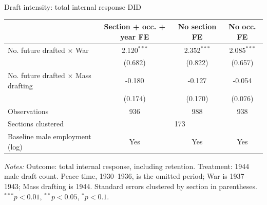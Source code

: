 \begin{frame}[t]{Draft intensity: total internal response DID}
    \scriptsize
    \centering
    \begin{threeparttable}
    \begin{tabular}{lccc}
        \toprule
        & Section + occ. + year FE & No section FE & No occ. FE \\
        \midrule
        No. future drafted $\times$ War & 2.120$^{***}$ & 2.352$^{***}$ & 2.085$^{***}$ \\
        & (0.682) & (0.822) & (0.657) \\
        No. future drafted $\times$ Mass drafting & -0.180 & -0.127 & -0.054 \\
        & (0.174) & (0.170) & (0.076) \\
        \midrule
        Observations & 936 & 988 & 938 \\
        Sections clustered & \multicolumn{3}{c}{173} \\
        Baseline male employment (log) & Yes & Yes & Yes \\
        \bottomrule
    \end{tabular}
    \begin{tablenotes}[flushleft]
        \tiny
        \item \textit{Notes:} Outcome: total internal response, including retention. Treatment: 1944 male draft count. Peace time, 1930--1936, is the omitted period; War is 1937--1943; Mass drafting is 1944. Standard errors clustered by section in parentheses. $^{***}p<0.01$, $^{**}p<0.05$, $^{*}p<0.1$.
    \end{tablenotes}
    \end{threeparttable}
\end{frame}

